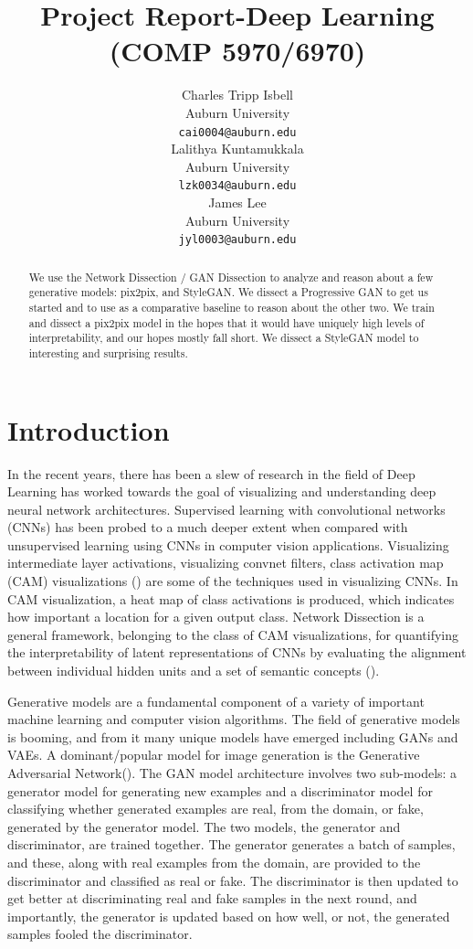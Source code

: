 \documentclass{article}
\title{Project Report-Deep Learning (COMP 5970/6970) }
\author  {%
  Charles Tripp Isbell \\
  Auburn University\\
  \texttt{cai0004@auburn.edu}\\
  \And
  Lalithya Kuntamukkala\\
  Auburn University\\
  \texttt{lzk0034@auburn.edu}\\
  \And
  James Lee\\
  Auburn University\\
  \texttt{jyl0003@auburn.edu}\\}
\begin{document}
\maketitle{}

\begin{abstract}
  We use the Network Dissection / GAN Dissection to analyze and reason about a few generative models: pix2pix, and StyleGAN. We dissect a Progressive GAN to get us started and to use as a comparative baseline to reason about the other two. We train and dissect a pix2pix model in the hopes that it would have uniquely high levels of interpretability, and our hopes mostly fall short. We dissect a StyleGAN model to interesting and surprising results.
\end{abstract}

\section{Introduction}
\label{gen_inst}

In the recent years, there has been a slew of research in the field of Deep Learning has worked towards the goal of visualizing and understanding deep neural network architectures.  Supervised learning with convolutional networks (CNNs) has been probed to a much deeper extent when compared with unsupervised learning using CNNs in computer vision applications. Visualizing intermediate layer activations, visualizing convnet filters, class activation map (CAM) visualizations (\cite{classactmap}) are some of the techniques used in visualizing CNNs. In CAM visualization, a heat map of class activations is produced, which indicates how important a location for a given output class. Network Dissection is a general framework, belonging to the class of CAM visualizations, for quantifying the interpretability of latent representations of CNNs by evaluating the alignment between individual hidden units and a set of semantic concepts (\cite{netdissect}). 

Generative models are a fundamental component of a variety of important machine learning and computer vision algorithms. The field of generative models is booming, and from it many unique models have emerged including GANs and VAEs. A dominant/popular model for image generation is the Generative Adversarial Network(\cite{gan}). The GAN model architecture involves two sub-models: a generator model for generating new examples and a discriminator model for classifying whether generated examples are real, from the domain, or fake, generated by the generator model. The two models, the generator and discriminator, are trained together. The generator generates a batch of samples, and these, along with real examples from the domain, are provided to the discriminator and classified as real or fake. The discriminator is then updated to get better at discriminating real and fake samples in the next round, and importantly, the generator is updated based on how well, or not, the generated samples fooled the discriminator.  
\end{document}
